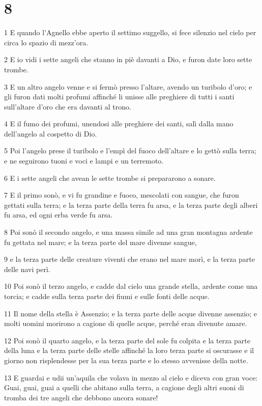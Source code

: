 \chapter{8}

\par 1 E quando l'Agnello ebbe aperto il settimo suggello, si fece silenzio nel cielo per circa lo spazio di mezz'ora.
\par 2 E io vidi i sette angeli che stanno in piè davanti a Dio, e furon date loro sette trombe.
\par 3 E un altro angelo venne e si fermò presso l'altare, avendo un turibolo d'oro; e gli furon dati molti profumi affinché li unisse alle preghiere di tutti i santi sull'altare d'oro che era davanti al trono.
\par 4 E il fumo dei profumi, unendosi alle preghiere dei santi, salì dalla mano dell'angelo al cospetto di Dio.
\par 5 Poi l'angelo prese il turibolo e l'empì del fuoco dell'altare e lo gettò sulla terra; e ne seguirono tuoni e voci e lampi e un terremoto.
\par 6 E i sette angeli che avean le sette trombe si prepararono a sonare.
\par 7 E il primo sonò, e vi fu grandine e fuoco, mescolati con sangue, che furon gettati sulla terra; e la terza parte della terra fu arsa, e la terza parte degli alberi fu arsa, ed ogni erba verde fu arsa.
\par 8 Poi sonò il secondo angelo, e una massa simile ad una gran montagna ardente fu gettata nel mare; e la terza parte del mare divenne sangue,
\par 9 e la terza parte delle creature viventi che erano nel mare morì, e la terza parte delle navi perì.
\par 10 Poi sonò il terzo angelo, e cadde dal cielo una grande stella, ardente come una torcia; e cadde sulla terza parte dei fiumi e sulle fonti delle acque.
\par 11 Il nome della stella è Assenzio; e la terza parte delle acque divenne assenzio; e molti uomini morirono a cagione di quelle acque, perché eran divenute amare.
\par 12 Poi sonò il quarto angelo, e la terza parte del sole fu colpita e la terza parte della luna e la terza parte delle stelle affinché la loro terza parte si oscurasse e il giorno non risplendesse per la sua terza parte e lo stesso avvenisse della notte.
\par 13 E guardai e udii un'aquila che volava in mezzo al cielo e diceva con gran voce: Guai, guai, guai a quelli che abitano sulla terra, a cagione degli altri suoni di tromba dei tre angeli che debbono ancora sonare!

